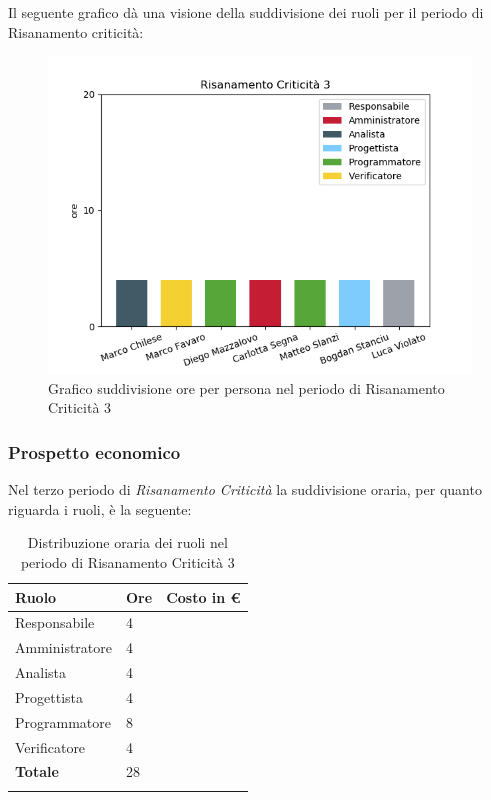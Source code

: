 Il seguente grafico dà una visione della suddivisione dei ruoli per il periodo di Risanamento criticità:\begin{figure}[H]
	\centering
	\includegraphics[width=1\linewidth]{./images/fig_rc3.png}
	\caption{Grafico suddivisione ore per persona nel periodo di Risanamento Criticità 3}
	\label{fig:grafico suddivione ruoli rc3}
\end{figure}

\subsubsection{Prospetto economico}
Nel terzo periodo di \textit{Risanamento Criticità} la suddivisione oraria, per quanto riguarda i ruoli, è la seguente: 

\begin{longtable}{| C{.30\textwidth}| C{.15\textwidth}| C{.20\textwidth}|}
	\hline
	\textbf{Ruolo} & \textbf{Ore} & \textbf{Costo in \euro} \\
	\hline 
	Responsabile & 4 &  \\
	\hline
	Amministratore & 4 &  \\
	\hline
	Analista & 4 &  \\
	\hline
	Progettista & 4 & \\
	\hline
	Programmatore & 8 &  \\
	\hline 
	Verificatore & 4 &  \\
	\hline
	\textbf{Totale} & 28 &  \\
	\hline 


\caption{Distribuzione oraria dei ruoli nel periodo di Risanamento Criticità 3}
\label{Distribuzione oraria rc3}
\end{longtable}

